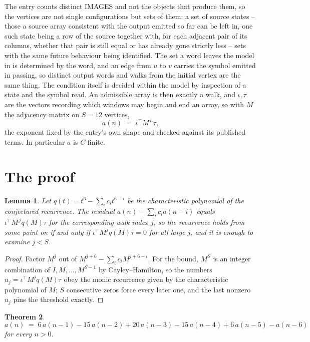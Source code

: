 \documentclass[11pt,a4paper]{article}
\theoremstyle{plain}
\newtheorem{theorem}{Theorem}
\newtheorem{lemma}[theorem]{Lemma}
\theoremstyle{definition}
\begin{document}
The entry counts distinct IMAGES and not the objects that produce them, so the vertices are not single configurations but sets of them: a set of source states -- those a source array consistent with the output emitted so far can be left in, one such state being a row of the source together with, for each adjacent pair of its columns, whether that pair is still equal or has already gone strictly less -- sets with the same future behaviour being identified. The set a word leaves the model in is determined by the word, and an edge from $u$ to $v$ carries the symbol emitted in passing, so distinct output words and walks from the initial vertex are the same thing. The condition itself is decided within the model by inspection of a state and the symbol read.
An admissible array is then exactly a walk, and $\iota,\tau$ are the vectors recording which windows may begin and end an array, so with $M$ the adjacency matrix on $S=12$ vertices,
\[
a(n)\;=\;\iota^{\!\top}M^{\,n}\tau ,
\]
the exponent fixed by the entry's own shape and checked against its published terms. In
particular $a$ is $C$-finite.

\section{The proof}

\begin{lemma}\label{lem:crit}
Let $q(t)=t^{6}-\sum_i c_it^{6-i}$ be the characteristic polynomial of the
conjectured recurrence. The residual $a(n)-\sum_ic_ia(n-i)$ equals
$\iota^{\!\top}M^{\,j}q(M)\tau$ for the corresponding walk index $j$, so the recurrence
holds from some point on if and only if $\iota^{\!\top}M^{j}q(M)\tau=0$ for all large $j$,
and it is enough to examine $j<S$.
\end{lemma}

\begin{proof}
Factor $M^{j}$ out of $M^{j+6}-\sum_ic_iM^{j+6-i}$. For the bound, $M^{S}$
is an integer combination of $I,M,\dots,M^{S-1}$ by Cayley--Hamilton, so the numbers
$u_j=\iota^{\!\top}M^{j}q(M)\tau$ obey the monic recurrence given by the characteristic
polynomial of $M$; $S$ consecutive zeros force every later one, and the last nonzero $u_j$
pins the threshold exactly.
\end{proof}

\begin{theorem}
\[
a(n)\;=\;6\,a(n-1) - 15\,a(n-2) + 20\,a(n-3) - 15\,a(n-4) + 6\,a(n-5) - a(n-6)
\]
for every $n>0$.
\end{theorem}
\end{document}
